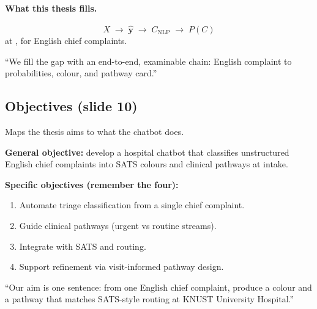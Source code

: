 \paragraph{What this thesis fills.}
\[
  X \;\to\; \hat{\mathbf{y}} \;\to\; C_{\mathrm{NLP}} \;\to\; P(C)
\]
at \examplehospital{}, for English chief complaints.

\begin{saybox}
``We fill the gap with an end-to-end, examinable chain: English complaint to probabilities, colour, and pathway card.''
\end{saybox}

\subsection{Objectives (slide 10)}

\begin{whybox}
Maps the thesis aims to what the chatbot does.
\end{whybox}

\textbf{General objective:} develop a hospital chatbot that classifies unstructured English chief complaints into SATS colours and clinical pathways at intake.

\textbf{Specific objectives (remember the four):}
\begin{enumerate}
  \item Automate triage classification from a single chief complaint.
  \item Guide clinical pathways (urgent vs routine streams).
  \item Integrate with SATS and \examplehospital{} routing.
  \item Support refinement via visit-informed pathway design.
\end{enumerate}

\begin{saybox}
``Our aim is one sentence: from one English chief complaint, produce a colour and a pathway that matches SATS-style routing at KNUST University Hospital.''
\end{saybox}
